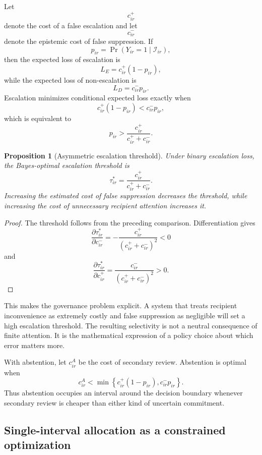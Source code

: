 \documentclass[11pt]{article}
\newtheorem{proposition}[definition]{Proposition}
\theoremstyle{definition}
\begin{document}
Let
\[
c_{ir}^{+}
\]
denote the cost of a false escalation and let
\[
c_{ir}^{-}
\]
denote the epistemic cost of false suppression. If
\[
p_{ir}
=
\Pr(Y_{ir}=1\mid\mathscr{I}_{ir}),
\]
then the expected loss of escalation is
\[
L_E
=
c_{ir}^{+}(1-p_{ir}),
\]
while the expected loss of non-escalation is
\[
L_D
=
c_{ir}^{-}p_{ir}.
\]
Escalation minimizes conditional expected loss exactly when
\[
c_{ir}^{+}(1-p_{ir})
<
c_{ir}^{-}p_{ir},
\]
which is equivalent to
\[
p_{ir}
>
\frac{c_{ir}^{+}}{c_{ir}^{+}+c_{ir}^{-}}.
\]

\begin{proposition}[Asymmetric escalation threshold]
Under binary escalation loss, the Bayes-optimal escalation threshold is
\[
\tau_{ir}^{*}
=
\frac{c_{ir}^{+}}{c_{ir}^{+}+c_{ir}^{-}}.
\]
Increasing the estimated cost of false suppression decreases the threshold, while increasing the cost of unnecessary recipient attention increases it.
\end{proposition}

\begin{proof}
The threshold follows from the preceding comparison. Differentiation gives
\[
\frac{\partial\tau_{ir}^{*}}{\partial c_{ir}^{-}}
=
-\frac{c_{ir}^{+}}{(c_{ir}^{+}+c_{ir}^{-})^2}
<0
\]
and
\[
\frac{\partial\tau_{ir}^{*}}{\partial c_{ir}^{+}}
=
\frac{c_{ir}^{-}}{(c_{ir}^{+}+c_{ir}^{-})^2}
>0.
\]
\end{proof}

This makes the governance problem explicit. A system that treats recipient inconvenience as extremely costly and false suppression as negligible will set a high escalation threshold. The resulting selectivity is not a neutral consequence of finite attention. It is the mathematical expression of a policy choice about which error matters more.

With abstention, let \(c_{ir}^{A}\) be the cost of secondary review. Abstention is optimal when
\[
c_{ir}^{A}
<
\min\left\{
c_{ir}^{+}(1-p_{ir}),
c_{ir}^{-}p_{ir}
\right\}.
\]
Thus abstention occupies an interval around the decision boundary whenever secondary review is cheaper than either kind of uncertain commitment.

\subsection{Single-interval allocation as a constrained optimization}
\end{document}
